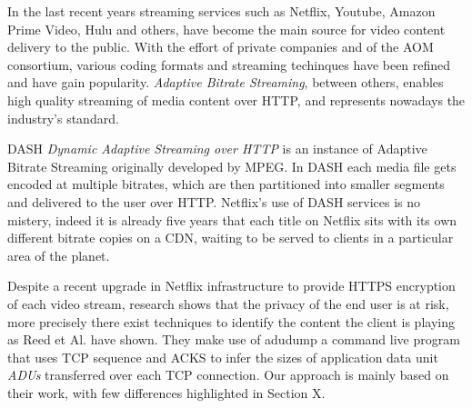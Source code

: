 
In the last recent years streaming services such as Netflix, Youtube, Amazon
Prime Video, Hulu and others, have become the main source for video content
delivery to the public. With the effort of private companies and of the AOM
consortium, various coding formats and streaming techinques have been refined
and have gain popularity. \textit{Adaptive Bitrate Streaming}, between others,
enables high quality streaming of media content over HTTP, and represents
nowadays the industry's standard. 

DASH \textit{Dynamic Adaptive Streaming over HTTP} is an instance of Adaptive
Bitrate Streaming originally developed by MPEG. In DASH each media file gets
encoded at multiple bitrates, which are then partitioned into smaller segments
and delivered to the user over HTTP.  Netflix's use of DASH services is no
mistery, indeed it is already five years that each title on Netflix sits with
its own different bitrate copies on a CDN, waiting to be served to clients in a
particular area of the planet. \cite{per-title-encoding}

Despite a recent upgrade in Netflix infrastructure to provide HTTPS encryption
of each video stream, research shows that the privacy of the end user is at
risk, more precisely there exist techniques to identify the content the client
is playing as Reed et Al. \cite{netflix-real-time} have shown. They make use of
adudump \cite{adudump} a command live program that uses TCP sequence and ACKS
to infer the sizes of application data unit \emph{ADUs} transferred over each
TCP connection. Our approach is mainly based on their work, with few
differences highlighted in Section X.

